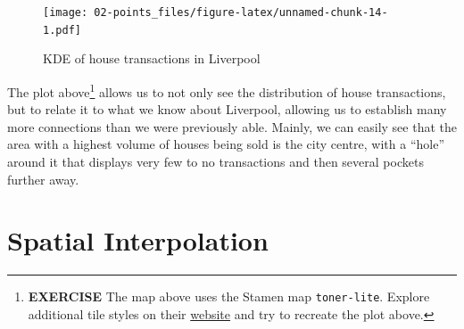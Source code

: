 \documentclass[]{book}
\newenvironment{Shaded}{\begin{snugshade}}{\end{snugshade}}
\newcommand{\CharTok}[1]{\textcolor[rgb]{0.31,0.60,0.02}{#1}}
\newcommand{\CommentTok}[1]{\textcolor[rgb]{0.56,0.35,0.01}{\textit{#1}}}
\newcommand{\DataTypeTok}[1]{\textcolor[rgb]{0.13,0.29,0.53}{#1}}
\newcommand{\DecValTok}[1]{\textcolor[rgb]{0.00,0.00,0.81}{#1}}
\newcommand{\FloatTok}[1]{\textcolor[rgb]{0.00,0.00,0.81}{#1}}
\newcommand{\KeywordTok}[1]{\textcolor[rgb]{0.13,0.29,0.53}{\textbf{#1}}}
\newcommand{\NormalTok}[1]{#1}
\newcommand{\OperatorTok}[1]{\textcolor[rgb]{0.81,0.36,0.00}{\textbf{#1}}}
\newcommand{\OtherTok}[1]{\textcolor[rgb]{0.56,0.35,0.01}{#1}}
\newcommand{\StringTok}[1]{\textcolor[rgb]{0.31,0.60,0.02}{#1}}
\let\rmarkdownfootnote\footnote%
\def\footnote{\protect\rmarkdownfootnote}
\begin{document}
\begin{Shaded}
\end{Shaded}

\begin{figure}
\centering
\texttt{[image: 02-points\_files/figure-latex/unnamed-chunk-14-1.pdf]}
\caption{\label{fig:unnamed-chunk-14}KDE of house transactions in Liverpool}
\end{figure}

The plot above\footnote{\textbf{EXERCISE} The map above uses the Stamen map \texttt{toner-lite}. Explore additional tile styles on their \href{http://maps.stamen.com/\#watercolor/12/37.7706/-122.3782}{website} and try to recreate the plot above.} allows us to not only see the distribution of house transactions, but to relate it to what we know about Liverpool, allowing us to establish many more connections than we were previously able. Mainly, we can easily see that the area with a highest volume of houses being sold is the city centre, with a ``hole'' around it that displays very few to no transactions and then several pockets further away.

\hypertarget{spatial-interpolation}{%
\section{Spatial Interpolation}\label{spatial-interpolation}}
\end{document}
